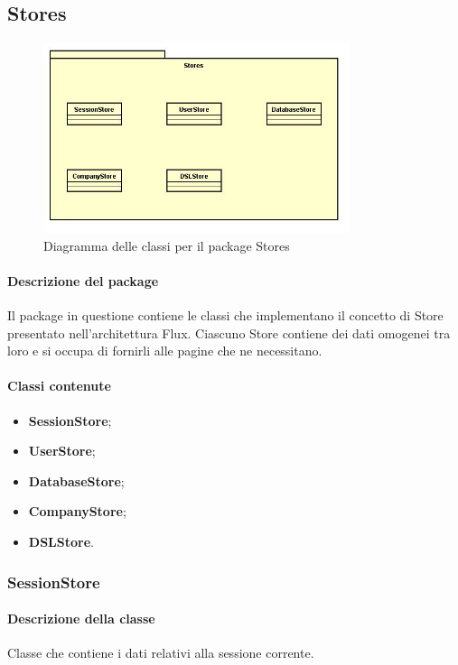 \subsection{Stores}

\begin{figure}[h]
\centering
\includegraphics[width=0.8\textwidth]{res/sections/imgs/stores-diagram.jpg}
\caption{Diagramma delle classi per il package Stores}
\end{figure}

\paragraph*{Descrizione del package}
Il package in questione contiene le classi che implementano il concetto di Store presentato nell'architettura Flux. Ciascuno Store contiene dei dati omogenei tra loro e si occupa di fornirli alle pagine che ne necessitano.
\paragraph*{Classi contenute}
\begin{itemize}
\item \textbf{SessionStore};
\item \textbf{UserStore};
\item \textbf{DatabaseStore};
\item \textbf{CompanyStore};
\item \textbf{DSLStore}.
\end{itemize}

\subsubsection{SessionStore}
\paragraph*{Descrizione della classe}
Classe che contiene i dati relativi alla sessione corrente.
